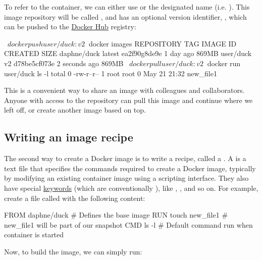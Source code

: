 %
To refer to the container, we can either use  or the designated name (i.e. ). This image repository will be called , and has an optional version identifier, , which can be pushed to the \hyperref[subsec:docker_hub]{Docker Hub} registry:

\begin{pclisting}
~$ docker push user/duck:v2
~$ docker images
REPOSITORY    TAG        IMAGE ID         CREATED          SIZE
daphne/duck   latest     ea2f90g8de9e     1 day ago        869MB
user/duck     v2         d78be5cf073e     2 seconds ago    869MB
~$ docker pull user/duck:v2
~$ docker run user/duck ls -l
total 0
-rw-r--r-- 1 root root 0 May 21 21:32 new_file1
\end{pclisting}
%
This is a convenient way to share an image with colleagues and collaborators. Anyone with access to the repository can pull this image and continue where we left off, or create another image based on top.

\subsection{Writing an image recipe}\label{subsec:writing-an-image-recipe}

The second way to create a Docker image is to write a recipe, called a . A  is a text file that specifies the commands required to create a Docker image, typically by modifying an existing container image using a scripting interface. They also have special \href{https://docs.docker.com/engine/reference/builder/}{keywords} (which are conventionally ), like \href{https://docs.docker.com/engine/reference/builder/#from}{}, \href{https://docs.docker.com/engine/reference/builder/#from}{}, \href{https://docs.docker.com/engine/reference/builder/#entrypoint}{} and so on. For example, create a file called  with the following content:

\begin{dockerlisting}
FROM daphne/duck      # Defines the base image
RUN touch new_file1   # new_file1 will be part of our snapshot
CMD ls -l             # Default command run when container is started
\end{dockerlisting}
%
Now, to build the image, we can simply run:

